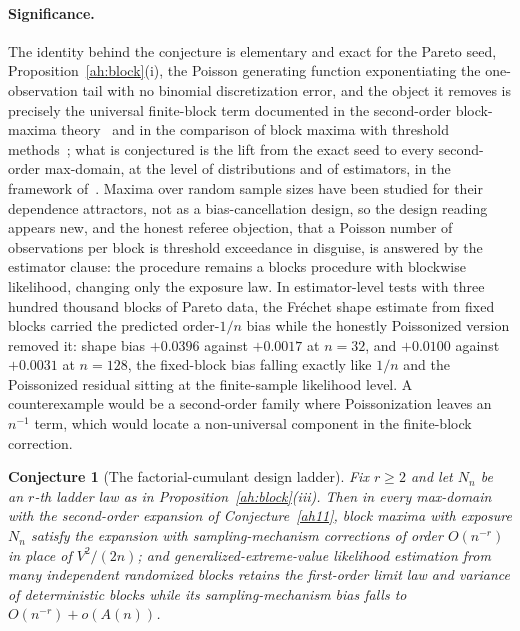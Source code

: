 \documentclass[11pt]{article}
\newtheorem{conjecture}{Conjecture}
\theoremstyle{definition}
\begin{document}
\paragraph{Significance.}
The identity behind the conjecture is elementary and exact for the Pareto seed, Proposition~\ref{ah:block}(i), the Poisson generating function exponentiating the one-observation tail with no binomial discretization error, and the object it removes is precisely the universal finite-block term documented in the second-order block-maxima theory~\cite{BVZ19,DF19} and in the comparison of block maxima with threshold methods~\cite{BZ21}; what is conjectured is the lift from the exact seed to every second-order max-domain, at the level of distributions and of estimators, in the framework of~\cite{dHF06}.  Maxima over random sample sizes have been studied for their dependence attractors, not as a bias-cancellation design, so the design reading appears new, and the honest referee objection, that a Poisson number of observations per block is threshold exceedance in disguise, is answered by the estimator clause: the procedure remains a blocks procedure with blockwise likelihood, changing only the exposure law.  In estimator-level tests with three hundred thousand blocks of Pareto data, the Fr\'echet shape estimate from fixed blocks carried the predicted order-$1/n$ bias while the honestly Poissonized version removed it: shape bias $+0.0396$ against $+0.0017$ at $n=32$, and $+0.0100$ against $+0.0031$ at $n=128$, the fixed-block bias falling exactly like $1/n$ and the Poissonized residual sitting at the finite-sample likelihood level.  A counterexample would be a second-order family where Poissonization leaves an $n^{-1}$ term, which would locate a non-universal component in the finite-block correction.

\begin{conjecture}[The factorial-cumulant design ladder]\label{ah12}
Fix $r\ge2$ and let $N_n$ be an $r$-th ladder law as in Proposition~\ref{ah:block}(iii).  Then in every max-domain with the second-order expansion of Conjecture~\ref{ah11}, block maxima with exposure $N_n$ satisfy the expansion with sampling-mechanism corrections of order $O(n^{-r})$ in place of $V^2/(2n)$; and generalized-extreme-value likelihood estimation from many independent randomized blocks retains the first-order limit law and variance of deterministic blocks while its sampling-mechanism bias falls to $O(n^{-r})+o(A(n))$.
\end{conjecture}
\end{document}
